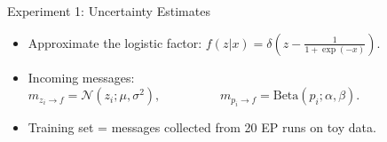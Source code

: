 \documentclass[english]{beamer}
\newcommand{\factor}{f}				%
\newcommand{\msg}[2]{m_{#1 \rightarrow #2}}			%
\begin{document}
\begin{frame}
\begin{columns}[t]
\begin{block}{ Experiment 1: Uncertainty Estimates}
\begin{itemize}

\item Approximate the logistic factor: 
    $f(z|x) = \delta\left(z-\frac{1}{1+\exp(-x)}\right)$. 
\item Incoming messages: 
    $\msg{z_i}{\factor} = \mathcal{N}(z_i; \mu, \sigma^2), \hspace{2cm}
    \msg{p_i}{\factor} = \text{Beta}(p_i; \alpha, \beta). $
\item Training set = messages collected from 20 EP runs on toy data.


\end{itemize}
\end{block}
\end{columns}
\end{frame}
\end{document}
